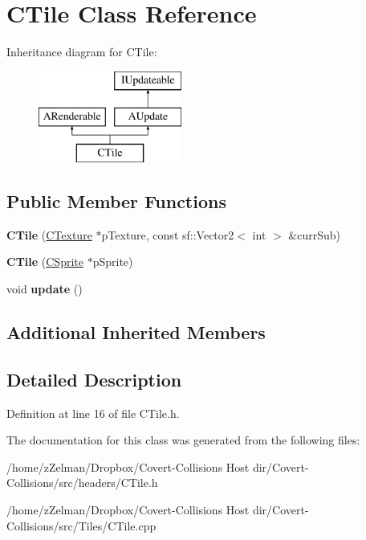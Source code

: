 \hypertarget{classCTile}{\section{C\-Tile Class Reference}
\label{classCTile}
}
Inheritance diagram for C\-Tile\-:\begin{figure}[H]
\begin{center}
\leavevmode
\includegraphics[height=3.000000cm]{classCTile}
\end{center}
\end{figure}
\subsection*{Public Member Functions}
\begin{DoxyCompactItemize}
\item 
\hypertarget{classCTile_a030eef2d18fb054c0fa6738784af0b0d}{{\bfseries C\-Tile} (\hyperlink{classCTexture}{C\-Texture} $\ast$p\-Texture, const sf\-::\-Vector2$<$ int $>$ \&curr\-Sub)}\label{classCTile_a030eef2d18fb054c0fa6738784af0b0d}

\item 
\hypertarget{classCTile_a07c38be9c331480eb7c8d526b084a287}{{\bfseries C\-Tile} (\hyperlink{classCSprite}{C\-Sprite} $\ast$p\-Sprite)}\label{classCTile_a07c38be9c331480eb7c8d526b084a287}

\item 
\hypertarget{classCTile_a818a17e48a7219eedac950b82c641ee0}{void {\bfseries update} ()}\label{classCTile_a818a17e48a7219eedac950b82c641ee0}

\end{DoxyCompactItemize}
\subsection*{Additional Inherited Members}


\subsection{Detailed Description}


Definition at line 16 of file C\-Tile.\-h.



The documentation for this class was generated from the following files\-:\begin{DoxyCompactItemize}
\item 
/home/z\-Zelman/\-Dropbox/\-Covert-\/\-Collisions Host dir/\-Covert-\/\-Collisions/src/headers/C\-Tile.\-h\item 
/home/z\-Zelman/\-Dropbox/\-Covert-\/\-Collisions Host dir/\-Covert-\/\-Collisions/src/\-Tiles/C\-Tile.\-cpp\end{DoxyCompactItemize}
